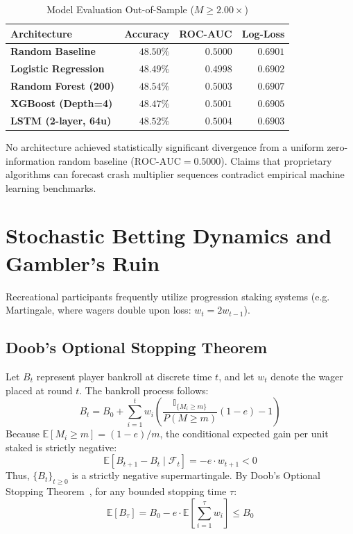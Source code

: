 \documentclass[10pt,journal,compsoc,twocolumn]{article}
\begin{document}
\begin{table}[ht]
\centering
\small
\caption{Model Evaluation Out-of-Sample ($M \ge 2.00\times$)}
\label{tab:ml_benchmark}
\begin{tabularx}{\columnwidth}{lrrr}
\toprule
\textbf{Architecture} & \textbf{Accuracy} & \textbf{ROC-AUC} & \textbf{Log-Loss} \\
\midrule
\textbf{Random Baseline} & $48.50\%$ & $0.5000$ & $0.6901$ \\
\textbf{Logistic Regression} & $48.49\%$ & $0.4998$ & $0.6902$ \\
\textbf{Random Forest (200)} & $48.54\%$ & $0.5003$ & $0.6907$ \\
\textbf{XGBoost (Depth=4)} & $48.47\%$ & $0.5001$ & $0.6905$ \\
\textbf{LSTM (2-layer, 64u)} & $48.52\%$ & $0.5004$ & $0.6903$ \\
\bottomrule
\end{tabularx}
\end{table}

No architecture achieved statistically significant divergence from a uniform zero-information random baseline ($\text{ROC-AUC} = 0.5000$). Claims that proprietary algorithms can forecast crash multiplier sequences contradict empirical machine learning benchmarks.

\section{Stochastic Betting Dynamics and Gambler's Ruin}
Recreational participants frequently utilize progression staking systems (e.g. Martingale, where wagers double upon loss: $w_t = 2 w_{t-1}$).

\subsection{Doob's Optional Stopping Theorem}
Let $B_t$ represent player bankroll at discrete time $t$, and let $w_t$ denote the wager placed at round $t$. The bankroll process follows:
\begin{equation}
    B_t = B_0 + \sum_{i=1}^t w_i \left( \frac{\mathbb{I}_{\{M_i \ge m\}}}{P(M \ge m)} (1 - e) - 1 \right)
\end{equation}
Because $\mathbb{E}[M_i \ge m] = (1-e)/m$, the conditional expected gain per unit staked is strictly negative:
\begin{equation}
    \mathbb{E}[B_{t+1} - B_t \mid \mathcal{F}_t] = -e \cdot w_{t+1} < 0
\end{equation}
Thus, $\{B_t\}_{t \ge 0}$ is a strictly negative supermartingale. By Doob's Optional Stopping Theorem~\cite{doob1953stochastic}, for any bounded stopping time $\tau$:
\begin{equation}
    \mathbb{E}[B_\tau] = B_0 - e \cdot \mathbb{E}\left[\sum_{i=1}^\tau w_i\right] \le B_0
\end{equation}
\end{document}
